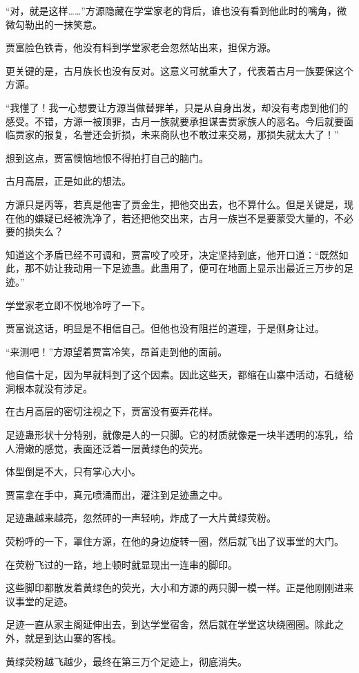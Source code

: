 \begin{this_body}
“对，就是这样……”方源隐藏在学堂家老的背后，谁也没有看到他此时的嘴角，微微勾勒出的一抹笑意。

贾富脸色铁青，他没有料到学堂家老会忽然站出来，担保方源。

更关键的是，古月族长也没有反对。这意义可就重大了，代表着古月一族要保这个方源。

“我懂了！我一心想要让方源当做替罪羊，只是从自身出发，却没有考虑到他们的感受。不错，方源一被顶罪，古月一族就要承担谋害贾家族人的恶名。今后就要面临贾家的报复，名誉还会折损，未来商队也不敢过来交易，那损失就太大了！”

想到这点，贾富懊恼地恨不得拍打自己的脑门。

古月高层，正是如此的想法。

方源只是丙等，若真是他害了贾金生，把他交出去，也不算什么。但是关键是，现在他的嫌疑已经被洗净了，若还把他交出来，古月一族岂不是要蒙受大量的，不必要的损失么？

知道这个矛盾已经不可调和，贾富咬了咬牙，决定坚持到底，他开口道：“既然如此，那不妨让我动用一下足迹蛊。此蛊用了，便可在地面上显示出最近三万步的足迹。”

学堂家老立即不悦地冷哼了一下。

贾富说这话，明显是不相信自己。但他也没有阻拦的道理，于是侧身让过。

“来测吧！”方源望着贾富冷笑，昂首走到他的面前。

他自信十足，因为早就料到了这个因素。因此这些天，都缩在山寨中活动，石缝秘洞根本就没有涉足。

在古月高层的密切注视之下，贾富没有耍弄花样。

足迹蛊形状十分特别，就像是人的一只脚。它的材质就像是一块半透明的冻乳，给人滑嫩的感觉，表面还泛着一层黄绿色的荧光。

体型倒是不大，只有掌心大小。

贾富拿在手中，真元喷涌而出，灌注到足迹蛊之中。

足迹蛊越来越亮，忽然砰的一声轻响，炸成了一大片黄绿荧粉。

荧粉呼的一下，罩住方源，在他的身边旋转一圈，然后就飞出了议事堂的大门。

在荧粉飞过的一路，地上顿时就显现出一连串的脚印。

这些脚印都散发着黄绿色的荧光，大小和方源的两只脚一模一样。正是他刚刚进来议事堂的足迹。

足迹一直从家主阁延伸出去，到达学堂宿舍，然后就在学堂这块绕圈圈。除此之外，就是到达山寨的客栈。

黄绿荧粉越飞越少，最终在第三万个足迹上，彻底消失。


\end{this_body}
